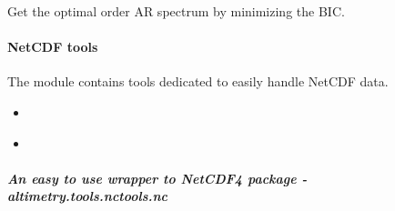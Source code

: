 \documentclass[letterpaper,10pt,english]{sphinxmanual}
\begin{document}

\begin{fulllineitems}
\label{altimetry.tools.spectrum:altimetry.tools.spectrum.optimal_AR_spectrum}
Get the optimal order AR spectrum by minimizing the BIC.

\end{fulllineitems}



\paragraph{NetCDF tools}
\label{altimetry.tools.nctools:netcdf-tools}\label{altimetry.tools.nctools::doc}
The {\hyperref[altimetry.tools.nctools:module-altimetry.tools.nctools]{\emph{}}} module contains tools dedicated to easily handle NetCDF data.
\begin{itemize}\setlength{\itemsep}{0pt}\setlength{\parskip}{0pt}
\item {} 
{\hyperref[altimetry.tools.nctools:nc]{\emph{}}}

\item {} 
{\hyperref[altimetry.tools.nctools:load-ncvar]{\emph{}}}

\end{itemize}


\subparagraph{An easy to use wrapper to NetCDF4 package - altimetry.tools.nctools.nc}
\label{altimetry.tools.nctools:nc}\label{altimetry.tools.nctools:an-easy-to-use-wrapper-to-netcdf4-package-altimetry-tools-nctools-nc}
\end{document}
